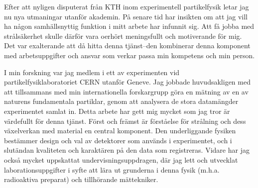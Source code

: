 \documentclass[11pt, a4paper]{../awesome-cv} %
\begin{document}
\sloppy %

\makecvheader %

\makelettertitle %


\begin{cvletter}
\vspace{.2cm}

Efter att nyligen disputerat från KTH inom experimentell partikelfysik letar jag nu nya utmaningar utanför akademin. %
På senare tid har insikten om att jag vill ha någon samhällsnyttig funktion i mitt arbete har infunnit sig.
Att få jobba med strålsäkerhet skulle därför vara oerhört meningsfullt och motiverande för mig.
Det var exalterande att då hitta denna tjänst–den kombinerar denna komponent med arbetsuppgifter och ansvar som verkar passa min kompetens och min person.


I min forskning var jag medlem i ett av experimenten vid partikelfysiklaboratoriet CERN utanför Geneve.
Jag jobbade huvudsakligen med att tillsammans med min internationella forskargrupp göra en mätning av en av naturens fundamentala partiklar, genom att analysera de stora datamängder experimentet samlat in. %
Detta arbete har gett mig mycket som jag tror är värdefullt för denna tjänst.
Först och främst är förståelse för strålning och dess växelverkan med material en central komponent. %
Den underliggande fysiken bestämmer design och val av detektorer som används i experimentet, och i slutändan kvaliteten och karaktären på den data som registreras. 
Vidare har jag också mycket uppskattat undervisningsuppdragen, där jag lett och utvecklat laborationsuppgifter i syfte att lära ut grunderna i denna fysik (m.h.a. radioaktiva preparat) och tillhörande mättekniker.


\end{cvletter}
\end{document}
